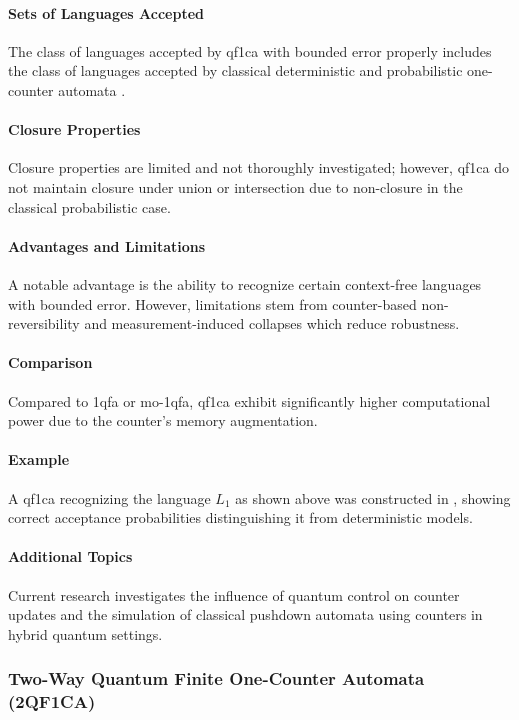 \paragraph{Sets of Languages Accepted}
The class of languages accepted by \gls{qf1ca} with bounded error properly includes the class of languages accepted by classical deterministic and probabilistic one-counter automata \cite{bonner2001quantum}.

\paragraph{Closure Properties} 
Closure properties are limited and not thoroughly investigated; however, \gls{qf1ca} do not maintain closure under union or intersection due to non-closure in the classical probabilistic case.

\paragraph{Advantages and Limitations} 
A notable advantage is the ability to recognize certain context-free languages with bounded error. However, limitations stem from counter-based non-reversibility and measurement-induced collapses which reduce robustness.

\paragraph{Comparison} 
Compared to \gls{1qfa} or \gls{mo-1qfa}, \gls{qf1ca} exhibit significantly higher computational power due to the counter's memory augmentation.

\paragraph{Example} 
A \gls{qf1ca} recognizing the language $L_1$ as shown above was constructed in \cite{bonner2001quantum}, showing correct acceptance probabilities distinguishing it from deterministic models.

\paragraph{Additional Topics} 
Current research investigates the influence of quantum control on counter updates and the simulation of classical pushdown automata using counters in hybrid quantum settings.

\subsubsection{Two-Way Quantum Finite One-Counter Automata (2QF1CA)}

